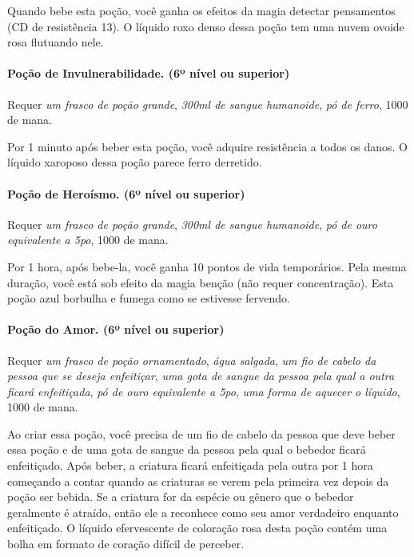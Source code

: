 \begin{multicols}{2}
Quando bebe esta poção, você ganha os efeitos da magia detectar pensamentos (CD
de resistência 13). O líquido roxo denso dessa poção tem uma nuvem ovoide rosa
flutuando nele.

\paragraph{Poção de Invulnerabilidade. (6º nível ou superior)}

Requer \textit{um frasco de poção grande}, \textit{300ml de sangue humanoide},
\textit{pó de ferro}, 1000 de mana.

Por 1 minuto após beber esta poção, você adquire resistência a todos os danos. O
líquido xaroposo dessa poção parece ferro derretido.

\paragraph{Poção de Heroísmo. (6º nível ou superior)}

Requer \textit{um frasco de poção grande}, \textit{300ml de sangue humanoide},
\textit{pó de ouro equivalente a 5po}, 1000 de mana.

Por 1 hora, após bebe-la, você ganha 10 pontos de vida temporários. Pela mesma
duração, você está sob efeito da magia benção (não requer concentração). Esta
poção azul borbulha e fumega como se estivesse fervendo.

\paragraph{Poção do Amor. (6º nível ou superior)}

Requer \textit{um frasco de poção ornamentado}, \textit{água salgada},
\textit{um fio de cabelo da pessoa que se deseja enfeitiçar}, \textit{uma gota
de sangue da pessoa pela qual a outra ficará enfeitiçada}, \textit{pó de ouro
equivalente a 5po}, \textit{uma forma de aquecer o líquido}, 1000 de mana.

Ao criar essa poção, você precisa de um fio de cabelo da pessoa que deve beber
essa poção e de uma gota de sangue da pessoa pela qual o bebedor ficará
enfeitiçado. Após beber, a criatura ficará enfeitiçada pela outra por 1 hora
começando a contar quando as criaturas se verem pela primeira vez depois da
poção ser bebida. Se a criatura for da espécie ou gênero que o bebedor
geralmente é atraído, então ele a reconhece como seu amor verdadeiro enquanto
enfeitiçado. O líquido efervescente de coloração rosa desta poção contém uma
bolha em formato de coração difícil de perceber.


\end{multicols}
